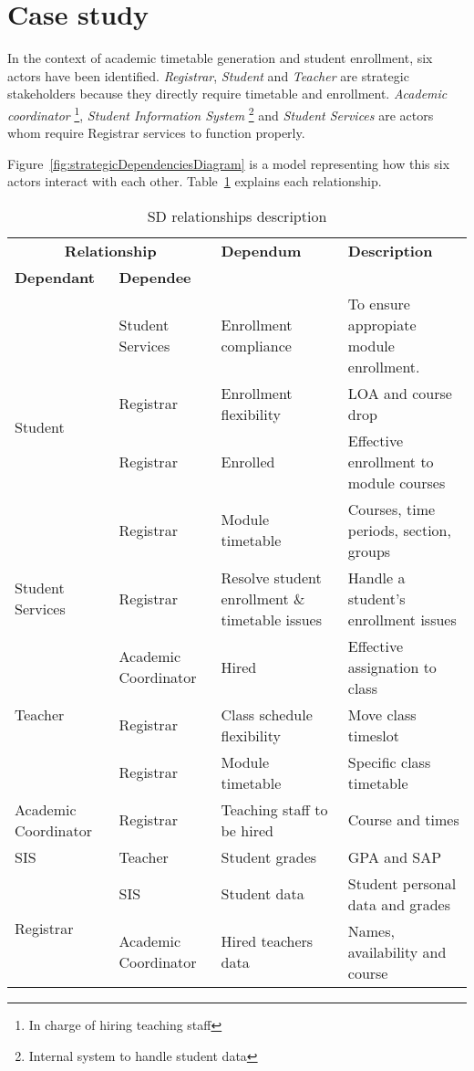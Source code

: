 \section{Case study}

In the context of academic timetable generation and student enrollment, six actors have been identified.
\textit{Registrar}, \textit{Student} and \textit{Teacher} are strategic stakeholders because they directly require timetable and enrollment.
\textit{Academic coordinator} \footnote{In charge of hiring teaching staff}, \textit{Student Information System} \footnote{Internal system to handle student data} and \textit{Student Services} are actors whom require Registrar services to function properly.

Figure~\ref{fig:strategicDependenciesDiagram} is a model representing how this six actors interact with each other.
Table~\ref{tab:strategicDependencies} explains each relationship.
\begin{table}
\centering
\caption{SD relationships description} \label{tab:strategicDependencies}
	\begin{tabularx}{\linewidth}{@{} p{0.8in} p{1.2in} p{1.6in} X @{}}
	\toprule
	\multicolumn{2}{c}{\textbf{Relationship}} & \textbf{Dependum} & \textbf{Description} \\
	\cmidrule(lr){1-2}
	\textbf{Dependant} & \textbf{Dependee} & & \\
	\midrule
	\multirow{4}{*}{Student} & Student Services & Enrollment compliance & To ensure appropiate module enrollment. \\
	& Registrar & Enrollment flexibility & LOA and course drop \\
	& Registrar & Enrolled & Effective enrollment to module courses \\
	& Registrar & Module timetable & Courses, time periods, section, groups \\
	\hline
	Student Services & Registrar & Resolve student enrollment \& timetable issues & Handle a student's enrollment issues\\
	\hline
	\multirow{3}{*}{Teacher} & Academic Coordinator & Hired & Effective assignation to class \\
	& Registrar & Class schedule flexibility & Move class timeslot \\
	& Registrar & Module timetable & Specific class timetable \\
	\hline
	Academic Coordinator & Registrar & Teaching staff to be hired & Course and times \\
	\hline
	SIS & Teacher & Student grades & GPA and SAP\\
	\hline
	\multirow{2}{*}{Registrar} & SIS & Student data & Student personal data and grades\\
	& Academic Coordinator & Hired teachers data & Names, availability and course\\
	\bottomrule
	\end{tabularx}
\end{table}

